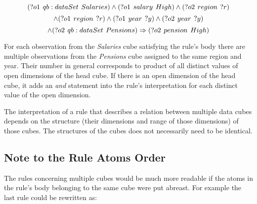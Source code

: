 \begin{minipage}{\textwidth}
$$
(?o1\hspace{0.4em}qb:dataSet\hspace{0.4em}Salaries) \land (?o1\hspace{0.4em}salary\hspace{0.4em}High) \land (?o2\hspace{0.4em}region\hspace{0.4em}?r)
$$
$$
\land (?o1\hspace{0.4em}region\hspace{0.4em}?r) \land (?o1\hspace{0.4em}year\hspace{0.4em}?y) \land (?o2\hspace{0.4em}year\hspace{0.4em}?y)
$$
$$
\land (?o2\hspace{0.4em}qb:dataSet\hspace{0.4em}Pensions) \Rightarrow (?o2\hspace{0.4em}pension\hspace{0.4em}High)
$$
\end{minipage}

For each observation from the \textit{Salaries} cube satisfying the rule's body there are multiple observations from the \textit{Pensions} cube assigned to the same region and year. Their number in general corresponds to product of all distinct values of open dimensions of the head cube. If there is an open dimension of the head cube, it adds an \textit{and} statement into the rule's interpretation for each distinct value of the open dimension.

The interpretation of a rule that describes a relation between multiple data cubes depends on the structure (their dimensions and range of those dimensions) of those cubes. The structures of the cubes does not necessarily need to be identical.

\subsection{Note to the Rule Atoms Order}

The rules concerning multiple cubes would be much more readable if the atoms in the rule's body belonging to the same cube were put abreast. For example the last rule could be rewritten as:

